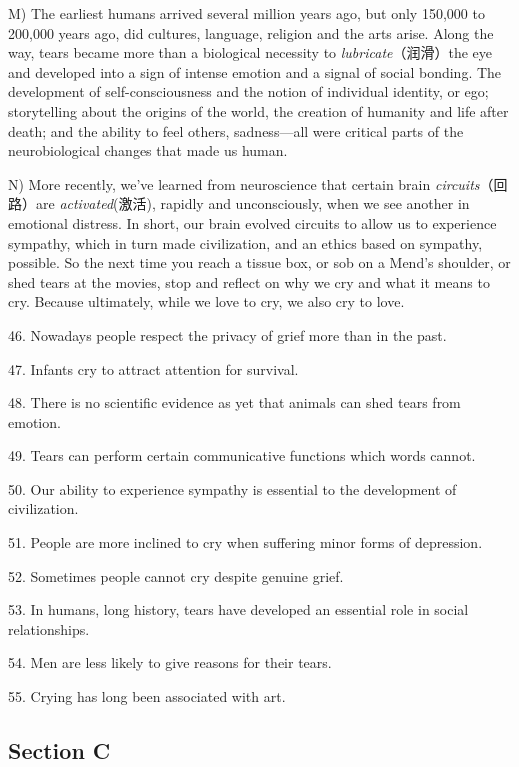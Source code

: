 \documentclass[UTF8,11pt]{ctexart}
\begin{document}
M) The earliest humans arrived several million years ago, but only 150,000 to 200,000 years ago, did cultures, language, religion and the arts arise. Along the way, tears became more than a biological necessity to\textit{ lubricate}（润滑）the eye and developed into a sign of intense emotion and a signal of social bonding. The development of self-consciousness and the notion of individual identity, or ego; storytelling about the origins of the world, the creation of humanity and life after death; and the ability to feel others, sadness—all were critical parts of the neurobiological changes that made us human.


N) More recently, we’ve learned from neuroscience that certain brain\textit{ circuits}（回路）are\textit{ activated}(激活), rapidly and unconsciously, when we see another in emotional distress. In short, our brain evolved circuits to allow us to experience sympathy, which in turn made civilization, and an ethics based on sympathy, possible. So the next time you reach a tissue box, or sob on a Mend’s shoulder, or shed tears at the movies, stop and reflect on why we cry and what it means to cry. Because ultimately, while we love to cry, we also cry to love.


46. Nowadays people respect the privacy of grief more than in the past.


47. Infants cry to attract attention for survival.


48. There is no scientific evidence as yet that animals can shed tears from emotion.


49. Tears can perform certain communicative functions which words cannot.


50. Our ability to experience sympathy is essential to the development of civilization.


51. People are more inclined to cry when suffering minor forms of depression.


52. Sometimes people cannot cry despite genuine grief.


53. In humans, long history, tears have developed an essential role in social relationships.


54. Men are less likely to give reasons for their tears.


55. Crying has long been associated with art.


\subsection*{Section C}
\end{document}
